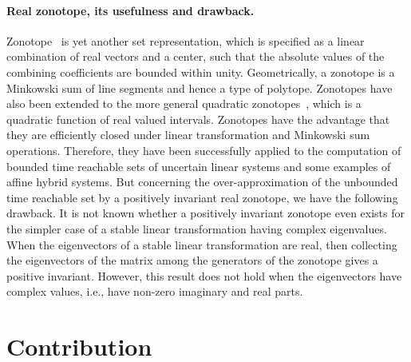 \documentclass[11pt,a4paper,twoside,openright]{article}
\begin{document}
\paragraph{Real zonotope, its usefulness and drawback.}
Zonotope~\cite{DBLP:conf/hybrid/Girard05} is yet another set
representation, which is specified as a linear combination of real
vectors and a center, such that the absolute values of the combining
coefficients are bounded within unity.  Geometrically, a zonotope is a
Minkowski sum of line segments and hence a type of polytope.
Zonotopes have also been extended to the more general quadratic
zonotopes~\cite{DBLP:conf/aplas/AdjeGW15}, which is a quadratic
function of real valued intervals.  Zonotopes have the advantage that
they are efficiently closed under linear transformation and Minkowski
sum operations.  Therefore, they have been successfully applied to the
computation of bounded time reachable sets of uncertain linear systems
and some examples of affine hybrid systems.  But concerning the
over-approximation of the unbounded time reachable set by a positively
invariant real zonotope, we have the following drawback.  It is not
known whether a positively invariant zonotope even exists for the
simpler case of a stable linear transformation having complex
eigenvalues.  When the eigenvectors of a stable linear transformation
are real, then collecting the eigenvectors of the matrix among the
generators of the zonotope gives a positive invariant.  However, this
result does not hold when the eigenvectors have complex values, i.e.,
have non-zero imaginary and real parts.



\section {Contribution}
\end{document}
